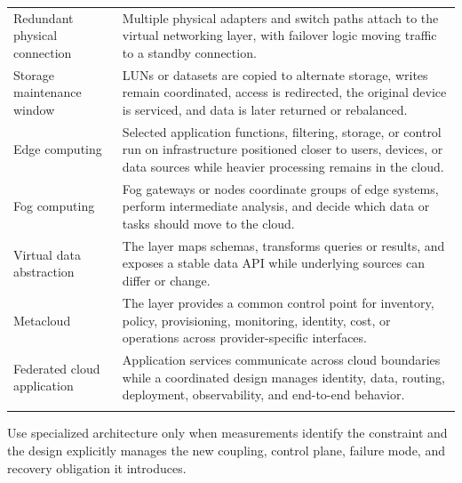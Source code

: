 \documentclass[11pt]{article}
\begin{document}
\begin{longtable}{@{}>{\RaggedRight\arraybackslash}p{}>{\RaggedRight\arraybackslash}p{}@{}}
Redundant physical connection & Multiple physical adapters and switch paths attach to the virtual networking layer, with failover logic moving traffic to a standby connection. \\\addlinespace[2pt]
Storage maintenance window & LUNs or datasets are copied to alternate storage, writes remain coordinated, access is redirected, the original device is serviced, and data is later returned or rebalanced. \\\addlinespace[2pt]
Edge computing & Selected application functions, filtering, storage, or control run on infrastructure positioned closer to users, devices, or data sources while heavier processing remains in the cloud. \\\addlinespace[2pt]
Fog computing & Fog gateways or nodes coordinate groups of edge systems, perform intermediate analysis, and decide which data or tasks should move to the cloud. \\\addlinespace[2pt]
Virtual data abstraction & The layer maps schemas, transforms queries or results, and exposes a stable data API while underlying sources can differ or change. \\\addlinespace[2pt]
Metacloud & The layer provides a common control point for inventory, policy, provisioning, monitoring, identity, cost, or operations across provider-specific interfaces. \\\addlinespace[2pt]
Federated cloud application & Application services communicate across cloud boundaries while a coordinated design manages identity, data, routing, deployment, observability, and end-to-end behavior. \\\addlinespace[2pt]
\bottomrule
\end{longtable}
\begin{takeawaybox}
Use specialized architecture only when measurements identify the constraint and the design explicitly manages the new coupling, control plane, failure mode, and recovery obligation it introduces.
\end{takeawaybox}
\end{document}
